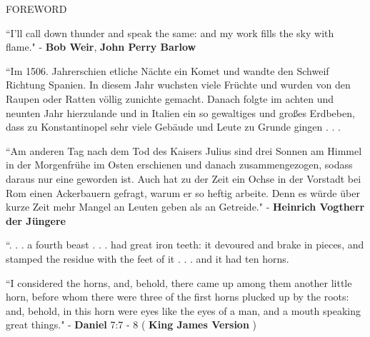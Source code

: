\documentclass[11pt]{article}
\begin{document}
\vspace*{0.01\baselineskip}

\begingroup
\begin{center}
\huge FOREWORD
\end{center}
\endgroup

\begingroup
\begin{center}
``I'll call down thunder and speak the same: and my work fills the sky with flame."
\rightskip\leftskip
\phantom{text} \hfill - \textbf{Bob Weir}, \textbf{John Perry Barlow}
\end{center}
\endgroup

\vspace*{0.1\baselineskip}

\begingroup
\begin{center}
``Im 1506. Jahrerschien etliche Nächte ein Komet und wandte den Schweif Richtung Spanien. In diesem Jahr wuchsten viele Früchte und wurden von den Raupen oder Ratten völlig zunichte gemacht. Danach folgte im achten und neunten Jahr hierzulande und in Italien ein so gewaltiges und großes Erdbeben, dass zu Konstantinopel sehr viele Gebäude und Leute zu Grunde gingen . . . 
\rightskip\leftskip
\phantom{text} \hfill \textcolor{white}{fuck}
\end{center}
\endgroup

\begingroup
\begin{center}
``Am anderen Tag nach dem Tod des Kaisers Julius sind drei Sonnen am Himmel in der Morgenfrühe im Osten erschienen und danach zusammengezogen, sodass daraus nur eine geworden ist. Auch hat zu der Zeit ein Ochse in der Vorstadt bei Rom einen Ackerbauern gefragt, warum er so heftig arbeite. Denn es würde über kurze Zeit mehr Mangel an Leuten geben als an Getreide."
\rightskip\leftskip
\phantom{text} \hfill - \textbf{Heinrich Vogtherr der Jüngere}
\end{center}
\endgroup

\vspace*{0.1\baselineskip}

\begingroup
\begin{center}
``. . . a fourth beast . . . had great iron teeth: it devoured and brake in pieces, and stamped the residue with the feet of it . . . and it had ten horns.
\rightskip\leftskip
\phantom{text} \hfill \textcolor{white}{fuck}
\end{center}
\endgroup

\begingroup
\begin{center}
``I considered the horns, and, behold, there came up among them another little horn, before whom there were three of the first horns plucked up by the roots: and, behold, in this horn were eyes like the eyes of a man, and a mouth speaking great things."
\rightskip\leftskip
\phantom{text} \hfill - \textbf{Daniel} 7:7 - 8 ( \textbf{King James Version} )
\end{center}
\endgroup
\end{document}
